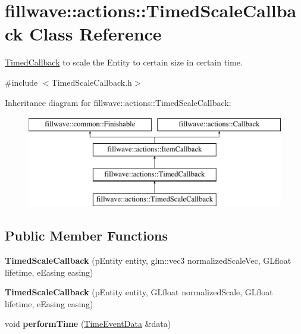 \hypertarget{classfillwave_1_1actions_1_1TimedScaleCallback}{}\section{fillwave\+:\+:actions\+:\+:Timed\+Scale\+Callback Class Reference}
\label{classfillwave_1_1actions_1_1TimedScaleCallback}


\hyperlink{classfillwave_1_1actions_1_1TimedCallback}{Timed\+Callback} to scale the Entity to certain size in certain time.  




{\ttfamily \#include $<$Timed\+Scale\+Callback.\+h$>$}

Inheritance diagram for fillwave\+:\+:actions\+:\+:Timed\+Scale\+Callback\+:\begin{figure}[H]
\begin{center}
\leavevmode
\includegraphics[height=4.000000cm]{classfillwave_1_1actions_1_1TimedScaleCallback}
\end{center}
\end{figure}
\subsection*{Public Member Functions}
\begin{DoxyCompactItemize}
\item 
\hypertarget{classfillwave_1_1actions_1_1TimedScaleCallback_a246321b590f774c61acccffa26a572f8}{}{\bfseries Timed\+Scale\+Callback} (p\+Entity entity, glm\+::vec3 normalized\+Scale\+Vec, G\+Lfloat lifetime, e\+Easing easing)\label{classfillwave_1_1actions_1_1TimedScaleCallback_a246321b590f774c61acccffa26a572f8}

\item 
\hypertarget{classfillwave_1_1actions_1_1TimedScaleCallback_a15673b54bb4bb3b1ea4c5612488a0a64}{}{\bfseries Timed\+Scale\+Callback} (p\+Entity entity, G\+Lfloat normalized\+Scale, G\+Lfloat lifetime, e\+Easing easing)\label{classfillwave_1_1actions_1_1TimedScaleCallback_a15673b54bb4bb3b1ea4c5612488a0a64}

\item 
\hypertarget{classfillwave_1_1actions_1_1TimedScaleCallback_a8c739ce94e400d12d5436ad0c3f48376}{}void {\bfseries perform\+Time} (\hyperlink{structfillwave_1_1actions_1_1TimeEventData}{Time\+Event\+Data} \&data)\label{classfillwave_1_1actions_1_1TimedScaleCallback_a8c739ce94e400d12d5436ad0c3f48376}

\end{DoxyCompactItemize}
